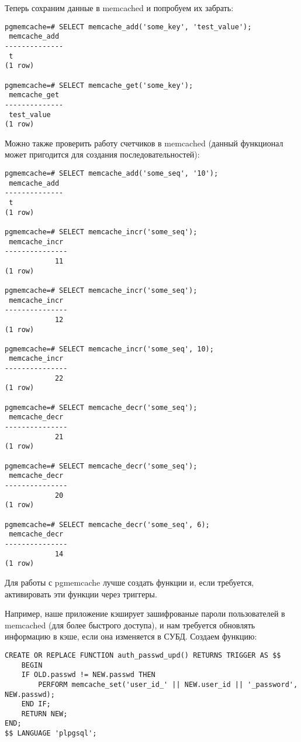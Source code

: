 Теперь сохраним данные в memcached и попробуем их забрать:
\begin{lstlisting}[label=lst:pgcache9,caption=Проверка]
pgmemcache=# SELECT memcache_add('some_key', 'test_value');
 memcache_add 
--------------
 t
(1 row)

pgmemcache=# SELECT memcache_get('some_key');
 memcache_get 
--------------
 test_value
(1 row)

\end{lstlisting}

Можно также проверить работу счетчиков в memcached (данный функционал может пригодится для создания последовательностей):
\begin{lstlisting}[label=lst:pgcache10,caption=Проверка]
pgmemcache=# SELECT memcache_add('some_seq', '10');
 memcache_add 
--------------
 t
(1 row)

pgmemcache=# SELECT memcache_incr('some_seq');
 memcache_incr 
---------------
            11
(1 row)

pgmemcache=# SELECT memcache_incr('some_seq');
 memcache_incr 
---------------
            12
(1 row)

pgmemcache=# SELECT memcache_incr('some_seq', 10);
 memcache_incr 
---------------
            22
(1 row)

pgmemcache=# SELECT memcache_decr('some_seq');
 memcache_decr 
---------------
            21
(1 row)

pgmemcache=# SELECT memcache_decr('some_seq');
 memcache_decr 
---------------
            20
(1 row)

pgmemcache=# SELECT memcache_decr('some_seq', 6);
 memcache_decr 
---------------
            14
(1 row)

\end{lstlisting}

Для работы с pgmemcache лучше создать функции и, если требуется, активировать эти функции через триггеры. 

Например, наше приложение кэширует зашифрованые пароли пользователей в memcached 
(для более быстрого доступа), 
и нам требуется обновлять информацию в кэше, если она изменяется в СУБД. Создаем функцию:
\begin{lstlisting}[label=lst:pgcache11,caption=Функция для обновления данных в кэше]
CREATE OR REPLACE FUNCTION auth_passwd_upd() RETURNS TRIGGER AS $$
	BEGIN
	IF OLD.passwd != NEW.passwd THEN
		PERFORM memcache_set('user_id_' || NEW.user_id || '_password', NEW.passwd);
	END IF;
	RETURN NEW;
END;
$$ LANGUAGE 'plpgsql';
\end{lstlisting}

